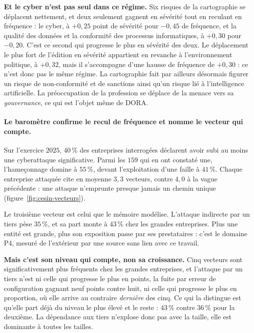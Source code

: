 \textbf{Et le cyber n'est pas seul dans ce régime.} Six risques de la cartographie se déplacent
nettement, et deux seulement gagnent en sévérité tout en reculant en fréquence : le cyber, à
$+0{,}25$ point de sévérité pour $-0{,}45$ de fréquence, et la qualité des données et la
conformité des processus informatiques, à $+0{,}30$ pour $-0{,}20$. C'est ce second qui progresse
le plus en sévérité des deux. Le déplacement le plus fort de l'édition en sévérité appartient en
revanche à l'environnement politique, à $+0{,}32$, mais il s'accompagne d'une hausse de fréquence
de $+0{,}30$ : ce n'est donc pas le même régime. La cartographie fait par ailleurs désormais
figurer un risque de non-conformité et de sanctions ainsi qu'un risque lié à l'intelligence
artificielle. La préoccupation de la profession se déplace de la menace vers sa
\emph{gouvernance}, ce qui est l'objet même de DORA.

\paragraph{Le baromètre confirme le recul de fréquence et nomme le vecteur qui compte.} Sur
l'exercice $2025$, $40\,\%$ des entreprises interrogées déclarent avoir subi au moins une
cyberattaque significative. Parmi les $159$ qui en ont constaté une, l'hameçonnage domine à
$55\,\%$, devant l'exploitation d'une faille à $41\,\%$. Chaque entreprise attaquée cite en
moyenne $3{,}3$ vecteurs, contre $4{,}0$ à la vague précédente : une attaque n'emprunte presque
jamais un chemin unique (figure~\ref{fig:cesin-vecteurs}).

Le troisième vecteur est celui que le mémoire modélise. L'attaque indirecte par un tiers pèse
$35\,\%$, et sa part monte à $43\,\%$ chez les grandes entreprises. Plus une entité est grande,
plus son exposition passe par ses prestataires : c'est le domaine P4, mesuré de l'extérieur par
une source sans lien avec ce travail.

\textbf{Mais c'est son niveau qui compte, non sa croissance.} Cinq vecteurs sont significativement
plus fréquents chez les grandes entreprises, et l'attaque par un tiers n'est ni celle qui progresse
le plus en points, la fuite par erreur de configuration gagnant neuf points contre huit, ni celle
qui progresse le plus en proportion, où elle arrive au contraire \emph{dernière} des cinq. Ce qui
la distingue est qu'elle part déjà du niveau le plus élevé et le reste : $43\,\%$ contre $36\,\%$
pour la deuxième. La dépendance aux tiers n'explose donc pas avec la taille, elle est dominante à
toutes les tailles.

